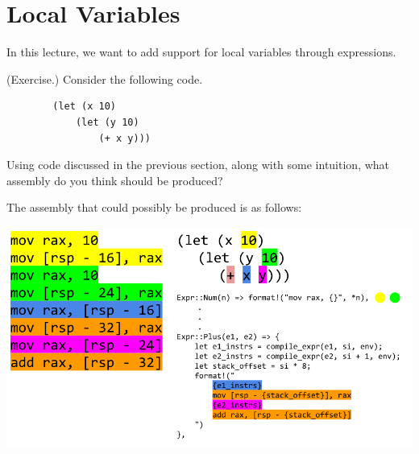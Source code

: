 \section{Local Variables}
In this lecture, we want to add support for local variables through  expressions. 

\begin{mdframed}
    (Exercise.) Consider the following code.
    \begin{verbatim}
        (let (x 10)
            (let (y 10)
                (+ x y)))\end{verbatim}
    Using code discussed in the previous section, along with some intuition, what assembly do you think should be produced?

    \begin{mdframed}
    \end{mdframed}
    The assembly that could possibly be produced is as follows:
    \begin{center}
        \includegraphics[scale=0.45]{assets/let_intro_asm.png}
    \end{center}
    

\end{mdframed}

